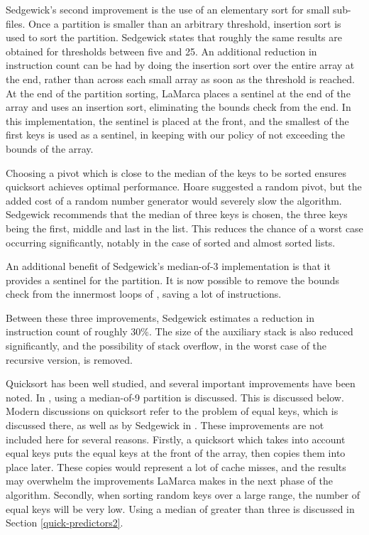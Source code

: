 Sedgewick's second improvement is the use of an elementary sort for small
sub-files. Once a partition is smaller than an arbitrary threshold, insertion
sort is used to sort the partition. Sedgewick states that roughly the same
results are obtained for thresholds between five and 25. An additional reduction
in instruction count can be had by doing the insertion sort over the entire
array at the end, rather than across each small array as soon as the threshold
is reached. At the end of the partition sorting, LaMarca places a sentinel at
the end of the array and uses an insertion sort, eliminating the bounds check
from the end. In this implementation, the sentinel is placed at the front, and
the smallest of the first  keys is used as a sentinel, in keeping
with our policy of not exceeding the bounds of the array.

Choosing a pivot which is close to the median of the keys to be sorted ensures
quicksort achieves optimal performance. Hoare suggested a random pivot, but the
added cost of a random number generator would severely slow the algorithm.
Sedgewick recommends that the median of three keys is chosen, the three keys
being the first, middle and last in the list. This reduces the chance of a worst
case occurring significantly, notably in the case of sorted and almost sorted
lists. 

An additional benefit of Sedgewick's median-of-3 implementation is that it
provides a sentinel for the partition. It is now possible to remove the bounds
check from the innermost loops of , saving a lot of instructions.

Between these three improvements, Sedgewick estimates a reduction in
instruction count of roughly 30\%. The size of the auxiliary stack is also
reduced significantly, and the possibility of stack overflow, in the worst case
of the recursive version, is removed.

Quicksort has been well studied, and several important improvements have been
noted. In \cite{BentleyMcIlroy93}, using a median-of-9 partition is discussed.
This is discussed below. Modern discussions on quicksort refer to the problem of
equal keys, which is discussed there, as well as by Sedgewick in
\cite{SedgewickBentley02}. These improvements are not included here for several
reasons. Firstly, a quicksort which takes into account equal keys puts the equal
keys at the front of the array, then copies them into place later. These copies
would represent a lot of cache misses, and the results may overwhelm the
improvements LaMarca makes in the next phase of the algorithm. Secondly, when
sorting random keys over a large range, the number of equal keys will be very
low. Using a median of greater than three is discussed in Section
\ref{quick-predictors2}.

